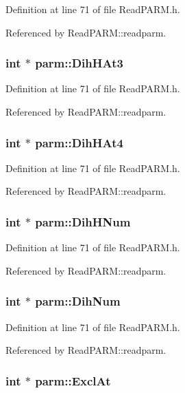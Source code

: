 Definition at line 71 of file Read\-PARM.h.

Referenced by Read\-PARM::readparm.
\subsubsection{\setlength{\rightskip}{0pt plus 5cm}int $\ast$ parm::Dih\-HAt3}\label{structparm_m78}




Definition at line 71 of file Read\-PARM.h.

Referenced by Read\-PARM::readparm.
\subsubsection{\setlength{\rightskip}{0pt plus 5cm}int $\ast$ parm::Dih\-HAt4}\label{structparm_m79}




Definition at line 71 of file Read\-PARM.h.

Referenced by Read\-PARM::readparm.
\subsubsection{\setlength{\rightskip}{0pt plus 5cm}int $\ast$ parm::Dih\-HNum}\label{structparm_m80}




Definition at line 71 of file Read\-PARM.h.

Referenced by Read\-PARM::readparm.
\subsubsection{\setlength{\rightskip}{0pt plus 5cm}int $\ast$ parm::Dih\-Num}\label{structparm_m85}




Definition at line 71 of file Read\-PARM.h.

Referenced by Read\-PARM::readparm.
\subsubsection{\setlength{\rightskip}{0pt plus 5cm}int $\ast$ parm::Excl\-At}\label{structparm_m59}




